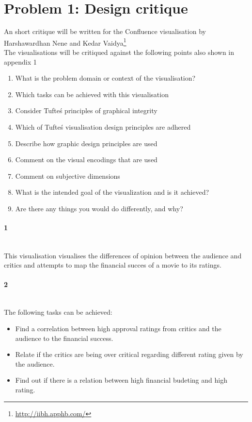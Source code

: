 \section{Problem 1: Design critique}

An short critique will be written for the Confluence visualisation by Harshawardhan Nene and Kedar Vaidya\footnote{\url{http://iibh.apphb.com/}}\\

The visualisations will be critiqued against the following points also shown in appendix 1

\begin{enumerate}[noitemsep]
    \item What is the problem domain or context of the visualisation?
    \item Which tasks can be achieved with this visualisation
    \item Consider Tufte\'s principles of graphical integrity
    \item Which of Tufte\'s visualisation design principles are adhered
    \item Describe how graphic design principles are used
    \item Comment on the visual encodings that are used
    \item Comment on subjective dimensions
    \item What is the intended goal of the visualization and is it achieved?
    \item Are there any things you would do differently, and why?
\end{enumerate}

\paragraph{1}\mbox{}\\
This visualisation visualises the differences of opinion between the audience and critics and attempts to map the financial succes of a movie to its ratings.

\paragraph{2}\mbox{}\\
The following tasks can be achieved:

\begin{itemize}[noitemsep]
    \item Find a correlation between high approval ratings from critics and the audience to the financial success.
    \item Relate if the critics are being over critical regarding different rating given by the audience.
    \item Find out if there is a relation between high financial budeting and high rating.
\end{itemize}

